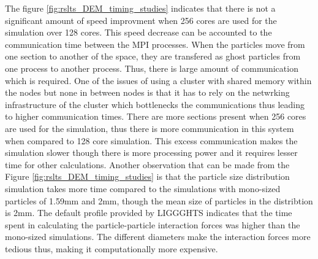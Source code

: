 \documentclass[preprint,11pt,authoryear]{elsarticle}
\begin{document}
\par The figure \ref{fig:rslts_DEM_timing_studies} indicates that there is not a significant amount of speed improvment when 256 cores are used for the simulation over 128 cores. This speed decrease can be accounted to the communication time between the MPI processes. When the particles move from one section to another of the space, they are transfered as ghost particles from one process to another process. Thus, there is large amount of communication which is required. One of the issues of using a cluster with shared memory within the nodes but none in between nodes is that it has to rely on the netwrking infrastructure of the cluster which bottlenecks the communications thus leading to higher communication times. There are more sections present when 256 cores are used for the simulation, thus there is more communication in this system when compared to 128 core simulation. This excess communication makes the simulation slower though there is more processing power and it requires lesser time for other calculations. Another observation that can be made from the Figure \ref{fig:rslts_DEM_timing_studies} is that the particle size distribution simulation takes more time compared to the simulations with mono-sized particles of 1.59mm and 2mm, though the mean size of particles in the distribtion is 2mm. The default profile provided by LIGGGHTS indicates that the time spent in calculating the particle-particle interaction forces was higher than the mono-sized simulations. The different diameters make the interaction forces more tedious thus, making it computationally more expensive. 
\end{document}
